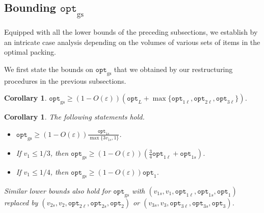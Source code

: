 \documentclass[10pt,a4paper]{amsart}
\newcommand{\ari}[1]{#1}
\renewcommand{\epsilon}{\varepsilon} %
\newtheorem{corollary}[theorem]{Corollary}
\theoremstyle{definition}
\newcommand{\alg}{\mathtt{opt}_{\mathrm{gs}}}
\newcommand{\opt}{\mathtt{opt}}
\newcommand{\optgs}{\mathtt{opt}_{\mathrm{gs}}}
\newcommand{\optonel}{\mathtt{opt}_{1\ell}}
\newcommand{\optones}{\mathtt{opt}_{1s}}
\newcommand{\opttwol}{\mathtt{opt}_{2\ell}}
\newcommand{\opttwos}{\mathtt{opt}_{2s}}
\newcommand{\optthreel}{\mathtt{opt}_{3\ell}}
\newcommand{\optthrees}{\mathtt{opt}_{3s}}
\newcommand{\vones}{v_{1s}}
\newcommand{\vtwos}{v_{2s}}
\newcommand{\vthrees}{v_{3s}}
\begin{document}
\subsection{Bounding \texorpdfstring{$\optgs$}{optgs}}
\label{subsec:bound}
Equipped with all the lower bounds of the preceding subsections, we establish  by an intricate case analysis depending on the volumes of various sets of items in the optimal packing. 




\mainlemma*

We first state the bounds on $\alg$ that we obtained by our restructuring procedures in the previous subsections.

\structuredpackingalgo*

\begin{corollary}
\label{thm:big&largealgo}
    $\alg \ge (1-O(\epsilon))(\opt_L + \max \{\optonel, \opttwol, \optthreel\})$.
\end{corollary}

\begin{corollary}
\label{cor:packingI1}
    The following statements hold.
    \begin{itemize}
        \item $\alg \ge (1-O(\epsilon))\displaystyle\frac{\optones}{\max\{3\vones,1\}}$.
        \item If $v_1 \le 1/3$, then $\displaystyle\alg \ge (1-O(\epsilon))\left(\frac{3}{4}\optonel + \optones\right)$.
        \item If $v_1 \le 1/4$, then $\alg \ge (1-O(\epsilon))\opt_1$.
    \end{itemize}
    Similar lower bounds also hold for $\alg$ with $(\vones,v_1,\optonel,\optones,\opt_1)$ replaced by \newline \noindent $(\vtwos,v_2,\opttwol,\opttwos,\opt_2)$ or $(\vthrees,v_3,\optthreel,\optthrees,\opt_3)$.
\end{corollary}
\end{document}
